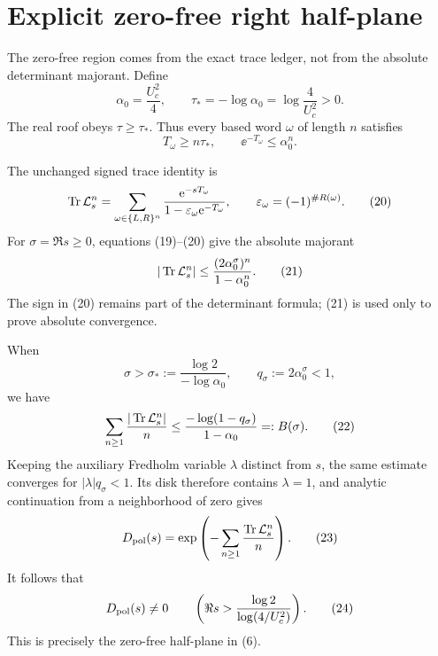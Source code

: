 \section{Explicit zero-free right half-plane}
The zero-free region comes from the exact trace ledger, not from the
absolute determinant majorant. Define
\[
 \alpha_0=\frac{U_c^2}{4},
 \qquad
 \tau_*=-\log\alpha_0=\log\frac4{U_c^2}>0.
 \tag{18}
\]
The real roof obeys \(\tau\ge\tau_*\). Thus every based word \(\omega\) of
length \(n\) satisfies
\[
 T_\omega\ge n\tau_*,
 \qquad \ee^{-T_\omega}\le\alpha_0^n.
 \tag{19}
\]

The unchanged signed trace identity is
\[
 \operatorname{Tr}\mathcal{L}_s^n
 =\sum_{\omega\in\{L,R\}^n}
 \frac{\mathrm{e}^{-sT_\omega}}
 {1-\varepsilon_\omega\mathrm{e}^{-T_\omega}},
 \qquad
 \varepsilon_\omega=(-1)^{\#R(\omega)}.
 \tag{20}
\]
For \(\sigma=\Re s\ge0\), equations (19)--(20) give the absolute
majorant
\[
 |\operatorname{Tr}\mathcal{L}_s^n|
 \le \frac{(2\alpha_0^\sigma)^n}{1-\alpha_0^n}.
 \tag{21}
\]
The sign in (20) remains part of the determinant formula; (21) is used only
to prove absolute convergence.

When
\[
 \sigma>\sigma_*:=\frac{\log2}{-\log\alpha_0},
 \qquad q_\sigma:=2\alpha_0^\sigma<1,
\]
we have
\[
 \sum_{n\ge1}\frac{|\operatorname{Tr}\mathcal{L}_s^n|}{n}
 \le
 \frac{-\log(1-q_\sigma)}{1-\alpha_0}
 =:B(\sigma).
 \tag{22}
\]
Keeping the auxiliary Fredholm variable \(\lambda\) distinct from \(s\),
the same estimate converges for \(|\lambda|q_\sigma<1\). Its disk therefore
contains \(\lambda=1\), and analytic continuation from a neighborhood of
zero gives
\[
 D_{\mathrm{pol}}(s)=
 \exp\left(-\sum_{n\ge1}\frac{\operatorname{Tr}\mathcal{L}_s^n}{n}\right).
 \tag{23}
\]
It follows that
\[
 D_{\mathrm{pol}}(s)\ne0
 \qquad\left(\Re s>
 \frac{\log2}{\log(4/U_c^2)}\right).
 \tag{24}
\]
This is precisely the zero-free half-plane in (6).
